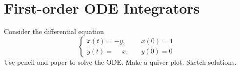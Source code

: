
\section{First-order ODE Integrators}
Consider the differential equation
\begin{equation}
\label{eq:ode_system}
\begin{cases} \dot{x}(t) = -y, & \quad x(0) = 1\\ \dot{y}(t) = \phantom{-}x, & \quad y(0) = 0 \end{cases}
\end{equation}
Use pencil-and-paper to solve the ODE. Make a quiver plot. Sketch solutions.\\


